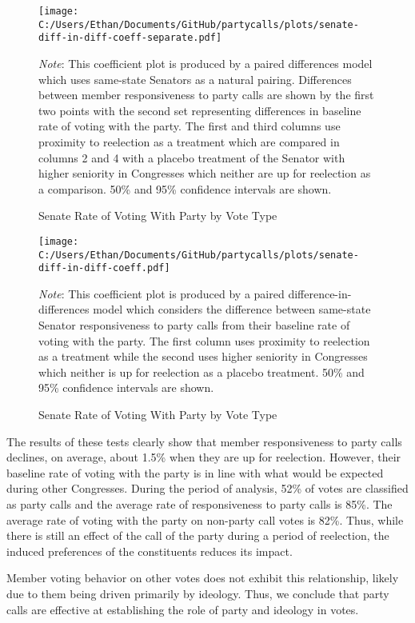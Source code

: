 \documentclass[12pt]{article}
\newcommand\fnote[1]{\captionsetup{font=small}\caption*{#1}}
\begin{document}
\begin{figure}[H]
	\centering
	\caption{Senate Rate of Voting With Party by Vote Type}
	\texttt{[image: C:/Users/Ethan/Documents/GitHub/partycalls/plots/senate-diff-in-diff-coeff-separate.pdf]}
	\fnote{\textit{Note}: This coefficient plot is produced by a paired differences model which uses same-state Senators as a natural pairing. Differences between member responsiveness to party calls are shown by the first two points with the second set representing differences in baseline rate of voting with the party. The first and third columns use proximity to reelection as a treatment which are compared in columns 2 and 4 with a placebo treatment of the Senator with higher seniority in Congresses which neither are up for reelection as a comparison. 50\% and 95\% confidence intervals are shown.}
\end{figure}

\begin{figure}[H]
	\centering
	\caption{Senate Rate of Voting With Party by Vote Type}
	\texttt{[image: C:/Users/Ethan/Documents/GitHub/partycalls/plots/senate-diff-in-diff-coeff.pdf]}
	\fnote{\textit{Note}: This coefficient plot is produced by a paired difference-in-differences model which considers the difference between same-state Senator responsiveness to party calls from their baseline rate of voting with the party. The first column uses proximity to reelection as a treatment while the second uses higher seniority in Congresses which neither is up for reelection as a placebo treatment. 50\% and 95\% confidence intervals are shown.}
\end{figure}

The results of these tests clearly show that member responsiveness to party calls declines, on average, about 1.5\% when they are up for reelection. However, their baseline rate of voting with the party is in line with what would be expected during other Congresses. During the period of analysis, 52\% of votes are classified as party calls and the average rate of responsiveness to party calls is 85\%. The average rate of voting with the party on non-party call votes is 82\%. Thus, while there is still an effect of the call of the party during a period of reelection, the induced preferences of the constituents reduces its impact.

Member voting behavior on other votes does not exhibit this relationship, likely due to them being driven primarily by ideology. Thus, we conclude that party calls are effective at establishing the role of party and ideology in votes.
\end{document}
